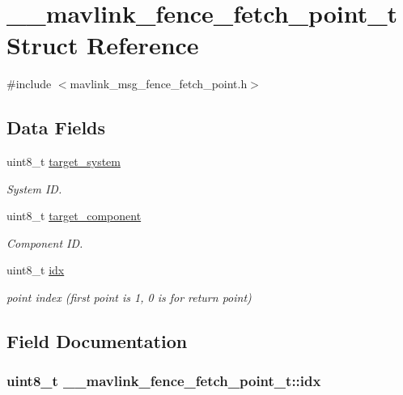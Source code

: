 \hypertarget{struct____mavlink__fence__fetch__point__t}{\section{\+\_\+\+\_\+mavlink\+\_\+fence\+\_\+fetch\+\_\+point\+\_\+t Struct Reference}
\label{struct____mavlink__fence__fetch__point__t}
}


{\ttfamily \#include $<$mavlink\+\_\+msg\+\_\+fence\+\_\+fetch\+\_\+point.\+h$>$}

\subsection*{Data Fields}
\begin{DoxyCompactItemize}
\item 
uint8\+\_\+t \hyperlink{struct____mavlink__fence__fetch__point__t_a9092078a8101383fdffd5c9bc3c3f0d8}{target\+\_\+system}
\begin{DoxyCompactList}\small\item\em System I\+D. \end{DoxyCompactList}\item 
uint8\+\_\+t \hyperlink{struct____mavlink__fence__fetch__point__t_a0e467753387665a9f24c7ae58327927a}{target\+\_\+component}
\begin{DoxyCompactList}\small\item\em Component I\+D. \end{DoxyCompactList}\item 
uint8\+\_\+t \hyperlink{struct____mavlink__fence__fetch__point__t_aa8f648037a526744c59cb0d8b21190e2}{idx}
\begin{DoxyCompactList}\small\item\em point index (first point is 1, 0 is for return point) \end{DoxyCompactList}\end{DoxyCompactItemize}


\subsection{Field Documentation}
\hypertarget{struct____mavlink__fence__fetch__point__t_aa8f648037a526744c59cb0d8b21190e2}{
\subsubsection[{idx}]{\setlength{\rightskip}{0pt plus 5cm}uint8\+\_\+t \+\_\+\+\_\+mavlink\+\_\+fence\+\_\+fetch\+\_\+point\+\_\+t\+::idx}}\label{struct____mavlink__fence__fetch__point__t_aa8f648037a526744c59cb0d8b21190e2}


